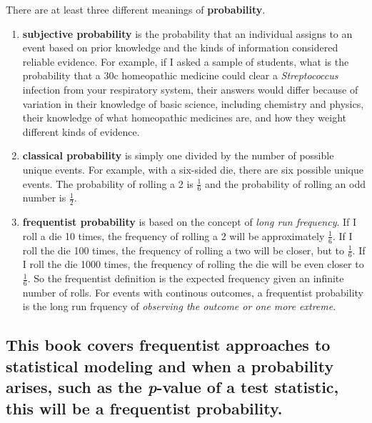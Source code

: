 \documentclass[]{book}
\begin{document}
There are at least three different meanings of \textbf{probability}.

\begin{enumerate}
\def\labelenumi{\arabic{enumi}.}
\item
  \textbf{subjective probability} is the probability that an individual assigns to an event based on prior knowledge and the kinds of information considered reliable evidence. For example, if I asked a sample of students, what is the probability that a 30c homeopathic medicine could clear a \emph{Streptococcus} infection from your respiratory system, their answers would differ because of variation in their knowledge of basic science, including chemistry and physics, their knowledge of what homeopathic medicines are, and how they weight different kinds of evidence.
\item
  \textbf{classical probability} is simply one divided by the number of possible unique events. For example, with a six-sided die, there are six possible unique events. The probability of rolling a 2 is \(\frac{1}{6}\) and the probability of rolling an odd number is \(\frac{1}{2}\).
\item
  \textbf{frequentist probability} is based on the concept of \textit{long run frequency}. If I roll a die 10 times, the frequency of rolling a 2 will be approximately \(\frac{1}{6}\). If I roll the die 100 times, the frequency of rolling a two will be closer, but to \(\frac{1}{6}\). If I roll the die 1000 times, the frequency of rolling the die will be even closer to \(\frac{1}{6}\). So the frequentist definition is the expected frequency given an infinite number of rolls. For events with continous outcomes, a frequentist probability is the long run frquency of \emph{observing the outcome or one more extreme}.
\end{enumerate}

\hypertarget{this-book-covers-frequentist-approaches-to-statistical-modeling-and-when-a-probability-arises-such-as-the-p-value-of-a-test-statistic-this-will-be-a-frequentist-probability.}{%
\subsection{\texorpdfstring{This book covers frequentist approaches to statistical modeling and when a probability arises, such as the \emph{p}-value of a test statistic, this will be a frequentist probability.}{This book covers frequentist approaches to statistical modeling and when a probability arises, such as the p-value of a test statistic, this will be a frequentist probability.}}\label{this-book-covers-frequentist-approaches-to-statistical-modeling-and-when-a-probability-arises-such-as-the-p-value-of-a-test-statistic-this-will-be-a-frequentist-probability.}}
\end{document}

